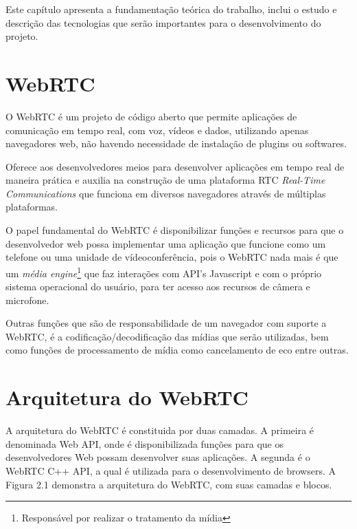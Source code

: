 \documentclass[12pt,a4paper,oneside]{report}
\begin{document}
Este capítulo apresenta a fundamentação teórica do trabalho, inclui o estudo e descrição das tecnologias que serão importantes para o desenvolvimento do projeto. 

\section{WebRTC}
\label{c_webRtc} 


O WebRTC é um projeto de código aberto que permite aplicações de comunicação em tempo real, com voz, vídeos e dados, utilizando apenas navegadores web, não havendo necessidade de instalação de plugins ou softwares.

Oferece aos desenvolvedores meios para desenvolver aplicações em tempo real de maneira prática e auxilia na construção de uma plataforma RTC \textit{Real-Time Communications} que funciona em diversos navegadores através de múltiplas plataformas.

O papel fundamental do WebRTC é disponibilizar funções e recursos para que o desenvolvedor web possa implementar uma aplicação que funcione como um telefone ou uma unidade de vídeoconferência, pois o WebRTC nada mais é que um \textit{média engine}\footnote{Responsável por realizar o tratamento da mídia} que faz interações com API's Javascript e com o próprio sistema operacional do usuário, para ter acesso aos recursos de câmera e microfone.

Outras funções que são de responsabilidade de um navegador com suporte a WebRTC, é a codificação/decodificação das mídias que serão utilizadas, bem como funções de processamento de mídia como cancelamento de eco entre outras.

\section{Arquitetura do WebRTC}
\label{s_webRtc}
A arquitetura do WebRTC é constituida por duas camadas. A primeira é denominada Web API, onde é disponibilizada funções para que os desenvolvedores Web possam desenvolver suas aplicações. A segunda é o WebRTC C++ API, a qual é utilizada para o desenvolvimento de browsers. A Figura 2.1 demonstra a arquitetura do WebRTC, com suas camadas e blocos.
\end{document}

